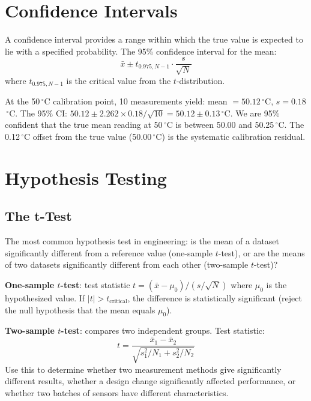 \documentclass[11pt,letterpaper,twoside,openany]{book}
\newcommand{\degC}{\ensuremath{{}^{\circ}\text{C}}}
\begin{document}
\section{Confidence Intervals}
A confidence interval provides a range within which the true value is expected to lie with a specified probability. The 95\% confidence interval for the mean:
\begin{equation}
\bar{x} \pm t_{0.975, N-1} \cdot \frac{s}{\sqrt{N}}
\end{equation}
where $t_{0.975, N-1}$ is the critical value from the $t$-distribution.

\begin{examplebox}
At the 50\,\degC{} calibration point, 10 measurements yield: mean $= 50.12$\,\degC{}, $s = 0.18$\,\degC{}. The 95\% CI: $50.12 \pm 2.262 \times 0.18/\sqrt{10} = 50.12 \pm 0.13$\,\degC{}. We are 95\% confident that the true mean reading at 50\,\degC{} is between 50.00 and 50.25\,\degC{}. The 0.12\,\degC{} offset from the true value (50.00\,\degC{}) is the systematic calibration residual.
\end{examplebox}

\section{Hypothesis Testing}
\subsection{The t-Test}
The most common hypothesis test in engineering: is the mean of a dataset significantly different from a reference value (one-sample $t$-test), or are the means of two datasets significantly different from each other (two-sample $t$-test)?

\textbf{One-sample $t$-test}: test statistic $t = (\bar{x} - \mu_0)/(s/\sqrt{N})$ where $\mu_0$ is the hypothesized value. If $|t| > t_{\text{critical}}$, the difference is statistically significant (reject the null hypothesis that the mean equals $\mu_0$).

\textbf{Two-sample $t$-test}: compares two independent groups. Test statistic:
\begin{equation}
t = \frac{\bar{x}_1 - \bar{x}_2}{\sqrt{s_1^2/N_1 + s_2^2/N_2}}
\end{equation}
Use this to determine whether two measurement methods give significantly different results, whether a design change significantly affected performance, or whether two batches of sensors have different characteristics.
\end{document}
